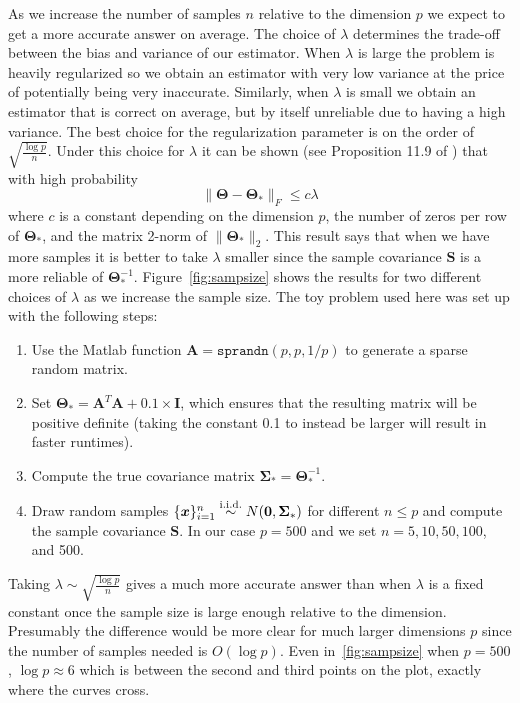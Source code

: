 \documentclass[10pt, letterpaper]{article}
\newcommand{\bx}{\boldsymbol x} %
\newcommand{\cov}{\boldsymbol \Sigma}
\newcommand{\preci}{\boldsymbol \Theta}
\newcommand{\iid}{\stackrel{\mathrm{i.i.d.}}{\sim}}
\newcommand{\sampcov}{\boldsymbol S} %
\newcommand{\eye}{\boldsymbol I} %
\newcommand{\bzero}{{\bf 0}}
\begin{document}
As we increase the number of samples $n$ relative to the dimension $p$ we expect to get a more accurate answer on average.  The choice of $\lambda$ determines the trade-off between the bias and variance of our estimator.  When $\lambda$ is large the problem is heavily regularized so we obtain an estimator with very low variance at the price of potentially being very inaccurate.  Similarly, when $\lambda$ is small we obtain an estimator that is correct on average, but by itself unreliable due to having a high variance.  The best choice for the regularization parameter is on the order of $\sqrt{\frac{\log p}{n}}$.  Under this choice for $\lambda$ it can be shown (see Proposition 11.9 of \cite{Wainwright}) that with high probability
\[
\|\preci - \preci_*\|_F \le c \lambda
\]
where $c$ is a constant depending on the dimension $p$, the number of zeros per row of $\preci_*$, and the matrix 2-norm of $\|\preci_*\|_2$.  This result says that when we have more samples it is better to take $\lambda$ smaller since the sample covariance $\sampcov$ is a more reliable of $\preci_*^{-1}$.  Figure~\ref{fig:sampsize} shows the results for two different choices of $\lambda$ as we increase the sample size.  The toy problem used here was set up with the following steps:
\begin{enumerate}
	\item Use the Matlab function ${\boldsymbol A} = \texttt{sprandn}(p, p, 1/p)$ to generate a sparse random matrix.
	\item Set $\preci_* = {\boldsymbol A}^T{\boldsymbol A} + 0.1\times \eye$, which ensures that the resulting matrix will be positive definite (taking the constant 0.1 to instead be larger will result in faster runtimes).
	\item Compute the true covariance matrix $\cov_* = \preci_*^{-1}$.
	\item Draw random samples $\{\bx\}_{i=1}^n \iid N(\bzero, \cov_*)$ for different $n \le p$ and compute the sample covariance $\sampcov$.  In our case $p=500$ and we set $n=5,10,50,100$, and 500.
\end{enumerate}
Taking $\lambda \sim \sqrt{\frac{\log p}{n}}$ gives a much more accurate answer than when $\lambda$ is a fixed constant once the sample size is large enough relative to the dimension.  Presumably the difference would be more clear for much larger dimensions $p$ since the number of samples needed is $O(\log p)$.  Even in~\ref{fig:sampsize} when $p=500$, $\log p \approx 6$ which is between the second and third points on the plot, exactly where the curves cross.\\
\end{document}
